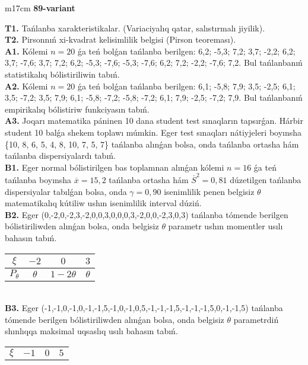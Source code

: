 \documentclass{article}
\begin{document}
\begin{tabular}{m{17cm}}
\textbf{89-variant}
\newline

\textbf{T1.} 
Tańlanba xarakteristikalar. (Variaciyalıq qatar, salıstırmalı jiyilik).
 \\
\textbf{T2.} 
Pirsonnıń xi-kvadrat kelisimlilik belgisi (Pirson teoreması).
 \\
\textbf{A1.} 
Kólemi \(n = 20\) ǵa teń bolǵan tańlanba berilgen: 6,2; -5,3; 7,2; 3,7; -2,2; 6,2; 3,7; -7,6; 3,7; 7,2; 6,2; -5,3; -7,6; -5,3; -7,6; 6,2; 7,2; -2,2; -7,6; 7,2. Bul tańlanbanıń statistikalıq bólistiriliwin tabıń.
 \\
\textbf{A2.} 
Kólemi \(n = 20\) ǵa teń bolǵan tańlanba berilgen: 6,1; -5,8; 7,9; 3,5; -2,5; 6,1; 3,5; -7,2; 3,5; 7,9; 6,1; -5,8; -7,2; -5,8; -7,2; 6,1; 7,9; -2,5; -7,2; 7,9. Bul tańlanbanıń empirikalıq bólistiriw funkciyasın tabıń.
 \\
\textbf{A3.} 
Joqarı matematika páninen 10 dana student test sınaqların tapsırǵan. Hárbir student 10 balǵa shekem toplawı múmkin. Eger test sınaqları nátiyjeleri boyınsha \{10, 8, 6, 5, 4, 8, 10, 7, 5, 7\} tańlanba alınǵan bolsa, onda tańlanba ortasha hám tańlanba dispersiyalardı tabıń.
 \\
\textbf{B1.} 
Eger normal bólistirilgen bas toplamnan alınǵan kólemi \(n = 16\) ǵa teń tańlanba boyınsha \(\overline{x} = 15,2\) tańlanba ortasha hám \({\overline{S}}^{2} = 0,81\) dúzetilgen tańlanba dispersiyalar tabılǵan bolsa, onda \(\gamma = 0,90\) isenimlilik penen belgisiz \(\theta\) matematikalıq kútiliw ushın isenimlilik interval dúziń.
 \\
\textbf{B2.} 
Eger (0,-2,0,-2,3,-2,0,0,3,0,0,0,3,-2,0,0,-2,3,0,3) tańlanba tómende berilgen bólistiriliwden alınǵan bolsa, onda belgisiz \(\theta\) parametr ushın momentler usılı bahasın tabıń.
\begin{tabular}{|c|c|c|c|}
  \hline
$\xi$ & $- 2$  & $0$  & $3$ \\
\hline
\(P_{\theta}\) & \(\theta\) & \(1 - 2\theta\) & \(\theta\) \\
\hline
\end{tabular}
 \\
\textbf{B3.} 
Eger (-1,-1,0,-1,0,-1,-1,5,-1,0,-1,0,5,-1,-1,-1,5,-1,-1,-1,5,0,-1,-1,5) tańlanba tómende berilgen bólistiriliwden alınǵan bolsa, onda belgisiz \(\theta\) parametrdiń shınlıqqa maksimal uqsaslıq usılı bahasın tabıń.
\begin{tabular}{|c|c|c|c|}
  \hline
$\xi$
&
$- 1$
&
$0$
&
$5$\\

\end{tabular}
\end{tabular}
\end{document}

